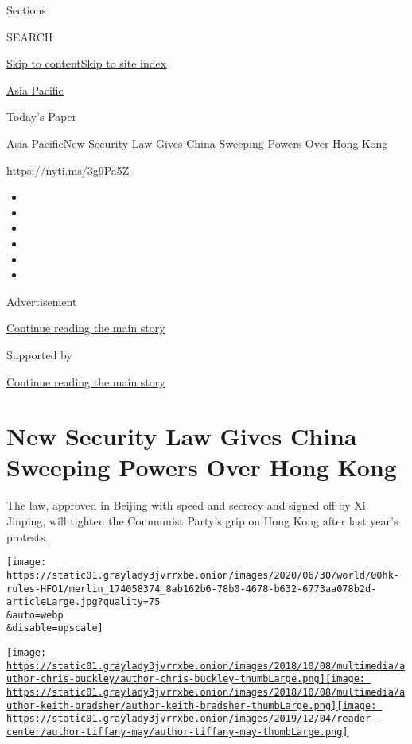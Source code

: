 Sections

SEARCH

\protect\hyperlink{site-content}{Skip to
content}\protect\hyperlink{site-index}{Skip to site index}

\href{https://www.nytimes3xbfgragh.onion/section/world/asia}{Asia
Pacific}

\href{https://myaccount.nytimes3xbfgragh.onion/auth/login?response_type=cookie\&client_id=vi}{}

\href{https://www.nytimes3xbfgragh.onion/section/todayspaper}{Today's
Paper}

\href{/section/world/asia}{Asia Pacific}\textbar{}New Security Law Gives
China Sweeping Powers Over Hong Kong

\url{https://nyti.ms/3g9Pa5Z}

\begin{itemize}
\item
\item
\item
\item
\item
\item
\end{itemize}

Advertisement

\protect\hyperlink{after-top}{Continue reading the main story}

Supported by

\protect\hyperlink{after-sponsor}{Continue reading the main story}

\hypertarget{new-security-law-gives-china-sweeping-powers-over-hong-kong}{%
\section{New Security Law Gives China Sweeping Powers Over Hong
Kong}\label{new-security-law-gives-china-sweeping-powers-over-hong-kong}}

The law, approved in Beijing with speed and secrecy and signed off by Xi
Jinping, will tighten the Communist Party's grip on Hong Kong after last
year's protests.

\texttt{[image: https://static01.graylady3jvrrxbe.onion/images/2020/06/30/world/00hk-rules-HFO1/merlin\_174058374\_8ab162b6-78b0-4678-b632-6773aa078b2d-articleLarge.jpg?quality=75\\\&auto=webp\\\&disable=upscale]}

\href{https://www.nytimes3xbfgragh.onion/by/chris-buckley}{\texttt{[image: https://static01.graylady3jvrrxbe.onion/images/2018/10/08/multimedia/author-chris-buckley/author-chris-buckley-thumbLarge.png]}}\href{https://www.nytimes3xbfgragh.onion/by/keith-bradsher}{\texttt{[image: https://static01.graylady3jvrrxbe.onion/images/2018/10/08/multimedia/author-keith-bradsher/author-keith-bradsher-thumbLarge.png]}}\href{https://www.nytimes3xbfgragh.onion/by/tiffany-may}{\texttt{[image: https://static01.graylady3jvrrxbe.onion/images/2019/12/04/reader-center/author-tiffany-may/author-tiffany-may-thumbLarge.png]}}

